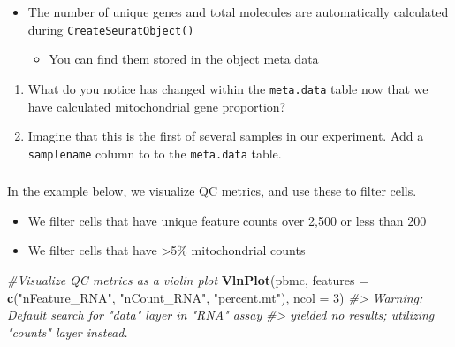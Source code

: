 \documentclass[
]{book}
\newenvironment{Shaded}{\begin{snugshade}}{\end{snugshade}}
\newcommand{\AttributeTok}[1]{\textcolor[rgb]{0.13,0.29,0.53}{#1}}
\newcommand{\CommentTok}[1]{\textcolor[rgb]{0.56,0.35,0.01}{\textit{#1}}}
\newcommand{\DecValTok}[1]{\textcolor[rgb]{0.00,0.00,0.81}{#1}}
\newcommand{\FunctionTok}[1]{\textcolor[rgb]{0.13,0.29,0.53}{\textbf{#1}}}
\newcommand{\NormalTok}[1]{#1}
\newcommand{\StringTok}[1]{\textcolor[rgb]{0.31,0.60,0.02}{#1}}
\providecommand{\tightlist}{%
  \setlength{\itemsep}{0pt}\setlength{\parskip}{0pt}}
\begin{document}
\begin{itemize}
\tightlist
\item
  The number of unique genes and total molecules are automatically calculated during \texttt{CreateSeuratObject()}

  \begin{itemize}
  \tightlist
  \item
    You can find them stored in the object meta data
  \end{itemize}
\end{itemize}

\begin{enumerate}
\def\labelenumi{\arabic{enumi}.}
\item
  What do you notice has changed within the \texttt{meta.data} table now that we have calculated mitochondrial gene proportion?
\item
  Imagine that this is the first of
  several samples in our experiment. Add a \texttt{samplename} column to to the \texttt{meta.data} table.
\end{enumerate}

\subsubsection*{}\label{section-2}

In the example below, we visualize QC metrics, and use these to filter cells.

\begin{itemize}
\tightlist
\item
  We filter cells that have unique feature counts over 2,500 or less than 200
\item
  We filter cells that have \textgreater5\% mitochondrial counts
\end{itemize}

\begin{Shaded}
\begin{Highlighting}[]
\CommentTok{\#Visualize QC metrics as a violin plot}
\FunctionTok{VlnPlot}\NormalTok{(pbmc, }\AttributeTok{features =} \FunctionTok{c}\NormalTok{(}\StringTok{"nFeature\_RNA"}\NormalTok{, }\StringTok{"nCount\_RNA"}\NormalTok{, }\StringTok{"percent.mt"}\NormalTok{), }\AttributeTok{ncol =} \DecValTok{3}\NormalTok{)}
\CommentTok{\#\textgreater{} Warning: Default search for "data" layer in "RNA" assay}
\CommentTok{\#\textgreater{} yielded no results; utilizing "counts" layer instead.}
\end{Highlighting}
\end{Shaded}
\end{document}
